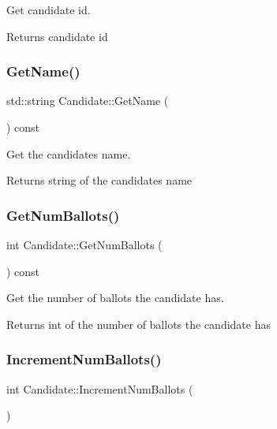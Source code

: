 Get candidate id. 

\begin{DoxyReturn}{Returns}
candidate id 
\end{DoxyReturn}
\mbox{\label{classCandidate_ad1ca1432a295579d2d61fd50a5988973}} 
\subsubsection{\texorpdfstring{Get\+Name()}{GetName()}}
{\footnotesize\ttfamily std\+::string Candidate\+::\+Get\+Name (\begin{DoxyParamCaption}{ }\end{DoxyParamCaption}) const}



Get the candidate\textquotesingle{}s name. 

\begin{DoxyReturn}{Returns}
string of the candidate\textquotesingle{}s name 
\end{DoxyReturn}
\mbox{\label{classCandidate_a966911d3f565a2d31cf9780b522340d8}} 
\subsubsection{\texorpdfstring{Get\+Num\+Ballots()}{GetNumBallots()}}
{\footnotesize\ttfamily int Candidate\+::\+Get\+Num\+Ballots (\begin{DoxyParamCaption}{ }\end{DoxyParamCaption}) const}



Get the number of ballots the candidate has. 

\begin{DoxyReturn}{Returns}
int of the number of ballots the candidate has 
\end{DoxyReturn}
\mbox{\label{classCandidate_a15a55468662174c8189b32fe344deb9e}} 
\subsubsection{\texorpdfstring{Increment\+Num\+Ballots()}{IncrementNumBallots()}}
{\footnotesize\ttfamily int Candidate\+::\+Increment\+Num\+Ballots (\begin{DoxyParamCaption}{ }\end{DoxyParamCaption})\hspace{0.3cm}{\ttfamily [protected]}}



